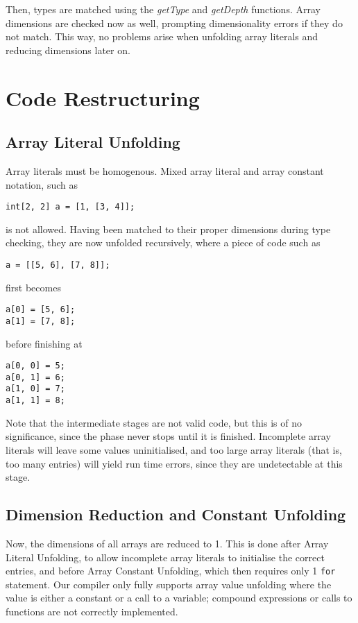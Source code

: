 \documentclass[a4paper,11pt]{report}
\begin{document}
Then, types are matched using the \emph{getType} and \emph{getDepth} functions. Array dimensions are checked now as well, prompting dimensionality errors if they do not match. This way, no problems arise when unfolding array literals and reducing dimensions later on.

\section{Code Restructuring}

\subsection{Array Literal Unfolding}
Array literals must be homogenous. Mixed array literal and array constant notation, such as
\begin{verbatim}
int[2, 2] a = [1, [3, 4]];
\end{verbatim}
is not allowed. Having been matched to their proper dimensions during type checking, they are now unfolded recursively, where a piece of code such as
\begin{verbatim}
a = [[5, 6], [7, 8]];
\end{verbatim}
first becomes
\begin{verbatim}
a[0] = [5, 6];
a[1] = [7, 8];
\end{verbatim}
before finishing at
\begin{verbatim}
a[0, 0] = 5;
a[0, 1] = 6;
a[1, 0] = 7;
a[1, 1] = 8;
\end{verbatim}
Note that the intermediate stages are not valid code, but this is of no significance, since the phase never stops until it is finished. Incomplete array literals will leave some values uninitialised, and too large array literals (that is, too many entries) will yield run time errors, since they are undetectable at this stage.

\subsection{Dimension Reduction and Constant Unfolding}
Now, the dimensions of all arrays are reduced to 1. This is done after Array Literal Unfolding, to allow incomplete array literals to initialise the correct entries, and before Array Constant Unfolding, which then requires only 1 \texttt{for} statement. Our compiler only fully supports array value unfolding where the value is either a constant or a call to a variable; compound expressions or calls to functions are not correctly implemented.
\end{document}
